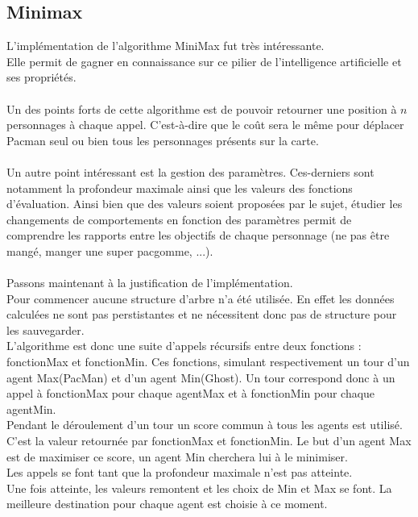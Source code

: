 \subsection{Minimax}

L'implémentation de l'algorithme MiniMax fut très intéressante.\\
Elle permit de gagner en connaissance sur ce pilier de l'intelligence artificielle et ses propriétés.\\\\

Un des points forts de cette algorithme est de pouvoir retourner une position à $n$ personnages à chaque appel. C'est-à-dire que le coût sera le même pour déplacer Pacman seul ou bien tous les personnages présents sur la carte.\\\\

Un autre point intéressant est la gestion des paramètres. Ces-derniers sont notamment la profondeur maximale ainsi que les valeurs des fonctions d'évaluation.
Ainsi bien que des valeurs soient proposées par le sujet, étudier les changements de comportements en fonction des paramètres permit de comprendre les rapports entre les objectifs de chaque personnage (ne pas être mangé, manger une super pacgomme, ...).\\\\


Passons maintenant à la justification de l'implémentation.\\
Pour commencer aucune structure d'arbre n'a été utilisée. En effet les données calculées ne sont pas perstistantes et ne nécessitent donc pas de structure pour les sauvegarder.\\
L'algorithme est donc une suite d'appels récursifs entre deux fonctions : fonctionMax et fonctionMin. Ces fonctions, simulant respectivement un tour d'un agent Max(PacMan) et d'un agent Min(Ghost). Un tour correspond donc à un appel à fonctionMax pour chaque agentMax et à fonctionMin pour chaque agentMin.\\
Pendant le déroulement d'un tour un score commun à tous les agents est utilisé. C'est la valeur retournée par fonctionMax et fonctionMin. Le but d'un agent Max est de maximiser ce score, un agent Min cherchera lui à le minimiser.\\
Les appels se font tant que la profondeur maximale n'est pas atteinte.\\
Une fois atteinte, les valeurs remontent et les choix de Min et Max se font. La meilleure destination pour chaque agent est choisie à ce moment.\\\\


